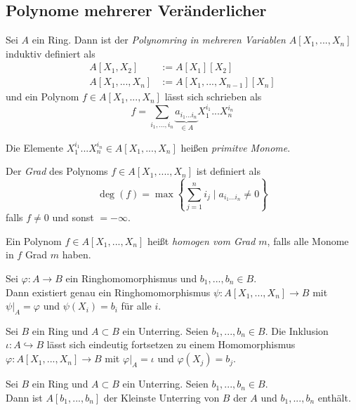 	\subsection{Polynome mehrerer Veränderlicher}
	\begin{definition}
		Sei $A$ ein Ring. Dann ist der \emph{Polynomring in mehreren Variablen} $A[X_1,...,X_n]$ induktiv definiert als 
		\begin{align*}
		A[X_1,X_2]&:=A[X_1][X_2]\\
		A[X_1,...,X_n]&:=A[X_1,...,X_{n-1}][X_n]
		\end{align*}
		und ein Polynom $f\in A[X_1,...,X_n]$ lässt sich schrieben als
		\[f=\sum_{i_1,...,i_n}\underbrace{a_{i_1...i_n}}_{\in A}X_1^{i_1}...X_n^{i_n}\]
	\end{definition}

	\begin{definition}
		Die Elemente $X_1^{i_1}...X_n^{i_n}\in A[X_1,...,X_n]$ heißen \emph{primitve Monome}.
	\end{definition}

	\begin{definition}
		Der \emph{Grad} des Polynoms $f\in A[X_1,....,X_n]$ ist definiert als
		\[\deg(f)=\max\left\{\sum_{j=1}^{n}i_j\mid a_{i_1...i_n}\neq 0\right\}\]
		falls $f\neq 0$ und sonst $=-\infty$.
	\end{definition}

	\begin{definition}
		Ein Polynom $f\in A[X_1,...,X_n]$ heißt \emph{homogen vom Grad $m$}, falls alle Monome in $f$ Grad $m$ haben.
	\end{definition}

	\begin{satz}
		Sei $\varphi:A\to B$ ein Ringhomomorphismus und $b_1,...,b_n\in B$.\\
		Dann existiert genau ein Ringhomomorphismus $\psi:A[X_1,...,X_n]\to B$ mit $\psi|_A=\varphi$ und $\psi(X_i)=b_i$ für alle $i$.
	\end{satz}

	\begin{satz}
		Sei $B$ ein Ring und $A\subset B$ ein Unterring. Seien $b_1,...,b_n\in B$. Die Inklusion $\iota:A\hookrightarrow B$ lässt sich eindeutig fortsetzen zu einem Homomorphismus $\varphi:A[X_1,...,X_n]\to B$ mit $\varphi|_A=\iota$ und $\varphi(X_j)=b_j$.
	\end{satz}

	\begin{kor}
		Sei $B$ ein Ring und $A\subset B$ ein Unterring. Seien $b_1,...,b_n\in B$.\\
		Dann ist $A[b_1,...,b_n]$ der Kleinste Unterring von $B$ der $A$ und $b_1,...,b_n$ enthält.
	\end{kor}

